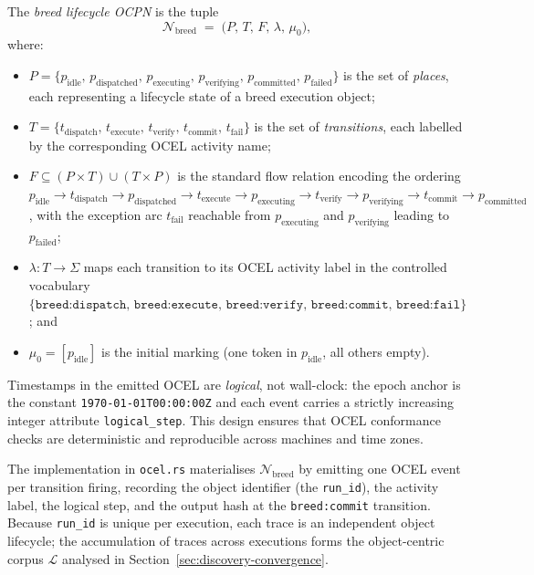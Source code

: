 \begin{definition}
\label{def:breed-ocpn}
The \emph{breed lifecycle OCPN} is the tuple
\[
  \mathcal{N}_{\mathrm{breed}}
  \;=\;
  \bigl(P,\, T,\, F,\, \lambda,\, \mu_0\bigr),
\]
where:
\begin{itemize}
  \item $P = \{p_{\mathrm{idle}},\, p_{\mathrm{dispatched}},\,
    p_{\mathrm{executing}},\, p_{\mathrm{verifying}},\,
    p_{\mathrm{committed}},\, p_{\mathrm{failed}}\}$
    is the set of \emph{places}, each representing a lifecycle state of a
    breed execution object;
  \item $T = \{t_{\mathrm{dispatch}},\, t_{\mathrm{execute}},\,
    t_{\mathrm{verify}},\, t_{\mathrm{commit}},\, t_{\mathrm{fail}}\}$
    is the set of \emph{transitions}, each labelled by the corresponding
    OCEL activity name;
  \item $F \subseteq (P \times T) \cup (T \times P)$ is the standard
    flow relation encoding the ordering
    $p_{\mathrm{idle}} \to t_{\mathrm{dispatch}} \to
     p_{\mathrm{dispatched}} \to t_{\mathrm{execute}} \to
     p_{\mathrm{executing}} \to t_{\mathrm{verify}} \to
     p_{\mathrm{verifying}} \to t_{\mathrm{commit}} \to
     p_{\mathrm{committed}}$,
    with the exception arc $t_{\mathrm{fail}}$ reachable from
    $p_{\mathrm{executing}}$ and $p_{\mathrm{verifying}}$ leading to
    $p_{\mathrm{failed}}$;
  \item $\lambda : T \to \Sigma$ maps each transition to its OCEL activity
    label in the controlled vocabulary
    $\{\texttt{breed:dispatch},\, \texttt{breed:execute},\,
      \texttt{breed:verify},\, \texttt{breed:commit},\,
      \texttt{breed:fail}\}$; and
  \item $\mu_0 = [p_{\mathrm{idle}}]$ is the initial marking (one token
    in $p_{\mathrm{idle}}$, all others empty).
\end{itemize}

Timestamps in the emitted OCEL are \emph{logical}, not wall-clock: the
epoch anchor is the constant \texttt{1970-01-01T00:00:00Z} and each event
carries a strictly increasing integer attribute \texttt{logical\_step}.
This design ensures that OCEL conformance checks are deterministic and
reproducible across machines and time zones.
\end{definition}

The implementation in \texttt{ocel.rs} materialises
$\mathcal{N}_{\mathrm{breed}}$ by emitting one OCEL event per transition
firing, recording the object identifier (the \texttt{run\_id}), the
activity label, the logical step, and the output hash at the
\texttt{breed:commit} transition.  Because \texttt{run\_id} is unique per
execution, each trace is an independent object lifecycle; the accumulation
of traces across executions forms the object-centric corpus $\mathcal{L}$
analysed in Section~\ref{sec:discovery-convergence}.

